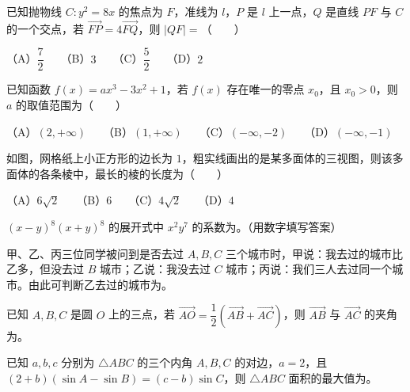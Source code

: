 \begin{question}
已知抛物线 $C:y^2=8x$ 的焦点为 $F$，准线为 $l$，$P$ 是 $l$ 上一点，$Q$ 是直线 $PF$ 与 $C$ 的一个交点，若 $\overrightarrow{FP}=4\overrightarrow{FQ}$，则 $|QF|=$\mbox{（　　）}

（A）$\dfrac72$　　（B）$3$　　（C）$\dfrac52$　　（D）$2$

\end{question}
\begin{question}
已知函数 $f(x)=ax^3-3x^2+1$，若 $f(x)$ 存在唯一的零点 $x_0$，且 $x_0>0$，则 $a$ 的取值范围为\mbox{（　　）}

（A）$(2,+\infty)$　　（B）$(1,+\infty)$　　（C）$(-\infty,-2)$　　（D）$(-\infty,-1)$

\Needspace{0.4\textheight}
\end{question}
\begin{question}
如图，网格纸上小正方形的边长为 $1$，粗实线画出的是某多面体的三视图，则该多面体的各条棱中，最长的棱的长度为\mbox{（　　）}
\nopagebreak[4]
\begin{center}\end{center}
\nopagebreak[4]
（A）$6\sqrt2$　　（B）$6$　　（C）$4\sqrt2$　　（D）$4$

\end{question}

\begin{question}
$(x-y)^8(x+y)^8$ 的展开式中 $x^2y^7$ 的系数为\gkblank{}。（用数字填写答案）

\end{question}
\begin{question}
甲、乙、丙三位同学被问到是否去过 $A,B,C$ 三个城市时，甲说：我去过的城市比乙多，但没去过 $B$ 城市；乙说：我没去过 $C$ 城市；丙说：我们三人去过同一个城市。由此可判断乙去过的城市为\gkblank{}。

\end{question}
\begin{question}
已知 $A,B,C$ 是圆 $O$ 上的三点，若 $\overrightarrow{AO}=\dfrac12(\overrightarrow{AB}+\overrightarrow{AC})$，则 $\overrightarrow{AB}$ 与 $\overrightarrow{AC}$ 的夹角为\gkblank{}。

\end{question}
\begin{question}
已知 $a,b,c$ 分别为 $\triangle ABC$ 的三个内角 $A,B,C$ 的对边，$a=2$，且 $(2+b)(\sin A-\sin B)=(c-b)\sin C$，则 $\triangle ABC$ 面积的最大值为\gkblank{}。

\end{question}

